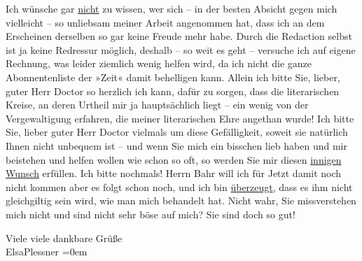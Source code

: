 \pstart
           {\pb}Ich wünsche gar \uline{nicht} zu wissen, wer sich – in
               der besten Absicht gegen mich vielleicht – so unliebsam meiner Arbeit angenommen hat,
               dass ich an dem Erscheinen derselben so gar keine Freude mehr habe. Durch die
               Redaction selbst ist ja keine Redressur möglich, deshalb – so weit es geht – versuche
               ich auf eigene Rechnung, was leider ziemlich wenig helfen wird, da ich nicht die
               ganze Abonnentenliste der »Zeit« damit behelligen
               kann. Allein ich bitte Sie, lieber, guter Herr Doctor so herzlich ich kann, dafür zu
               sorgen, dass die literarischen Kreise, an deren Urtheil {\pb}mir ja
               hauptsächlich liegt – ein wenig von der Vergewaltigung erfahren, die meiner
               literarischen Ehre angethan wurde! Ich bitte Sie, lieber guter Herr Doctor vielmals
               um diese Gefälligkeit, soweit sie natürlich Ihnen nicht unbequem ist – und wenn Sie
               mich ein bisschen lieb haben und mir beistehen und helfen wollen wie schon so oft, so
               werden Sie mir diesen \uline{innigen Wunsch} erfüllen.
               {\pb}Ich bitte nochmals! Herrn Bahr will ich
               für Jetzt damit noch nicht kommen aber es folgt schon noch, und ich bin \uline{überzeugt}, dass es ihm nicht gleichgiltig sein wird,
               wie man mich behandelt hat. Nicht wahr, Sie missverstehen mich nicht und sind nicht
               sehr böse auf mich? Sie sind doch so gut!\pend
           
\pstart
           Viele viele dankbare Grüße{\\[\baselineskip]}\spacefill\mbox{ElsaPlessner}\pend
           \leftskip=0em{}\endnumbering{}
\begin{anhang}
\end{anhang}
      